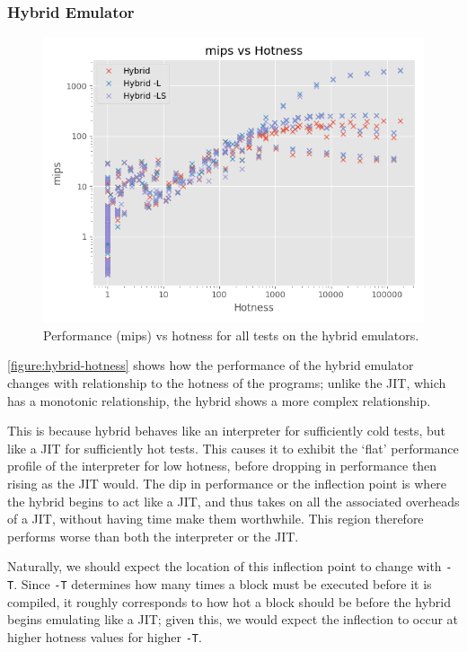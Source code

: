 \subsubsection{Hybrid Emulator}






\begin{figure}[h]
    \centering
    \includegraphics[scale=0.75]{output/graphs/scatter/hybrid/hotness.png}
    \caption{Performance (mips) vs hotness for all tests on the hybrid emulators.}
    \label{figure:hybrid-hotness}
\end{figure}

\autoref{figure:hybrid-hotness} shows how the performance of the hybrid emulator changes with relationship to the hotness of the programs; unlike the JIT, which has a monotonic relationship, the hybrid shows a more complex relationship.

This is because hybrid behaves like an interpreter for sufficiently cold tests, but like a JIT for sufficiently hot tests. This causes it to exhibit the `flat' performance profile of the interpreter for low hotness, before dropping in performance then rising as the JIT would. The dip in performance or the inflection point is where the hybrid begins to act like a JIT, and thus takes on all the associated overheads of a JIT, without having time make them worthwhile. This region therefore performs worse than both the interpreter or the JIT.

Naturally, we should expect the location of this inflection point to change with \texttt{-T}. Since \texttt{-T} determines how many times a block must be executed before it is compiled, it roughly corresponds to how hot a block should be before the hybrid begins emulating like a JIT; given this, we would expect the inflection to occur at higher hotness values for higher \texttt{-T}.


